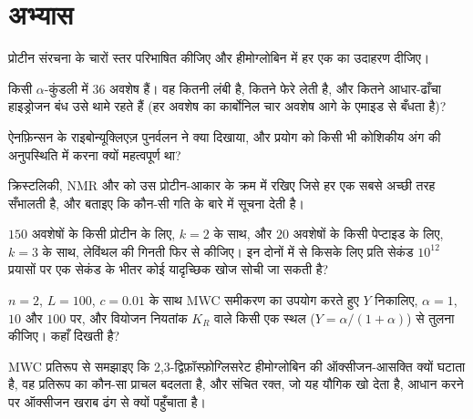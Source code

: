 \section{अभ्यास}

\begin{exercise}[$\star$]\label{exo:b3:structural-biology:1}
प्रोटीन संरचना के चारों स्तर परिभाषित कीजिए और हीमोग्लोबिन में हर एक का
उदाहरण दीजिए।
\end{exercise}

\begin{exercise}[$\star$]\label{exo:b3:structural-biology:2}
किसी $\alpha$-कुंडली में $36$ अवशेष हैं। वह कितनी लंबी है, कितने फेरे
लेती है, और कितने आधार-ढाँचा हाइड्रोजन बंध उसे थामे रहते हैं (हर अवशेष
का कार्बोनिल चार अवशेष आगे के एमाइड से बँधता है)?
\end{exercise}

\begin{exercise}[$\star$]\label{exo:b3:structural-biology:3}
ऐनफ़िन्सन के राइबोन्यूक्लिएज़ पुनर्वलन ने क्या दिखाया, और प्रयोग को
किसी भी कोशिकीय अंग की अनुपस्थिति में करना क्यों महत्वपूर्ण था?
\end{exercise}

\begin{exercise}[$\star$]\label{exo:b3:structural-biology:4}
क्रिस्टलिकी, NMR और  को उस प्रोटीन-आकार
के क्रम में रखिए जिसे हर एक सबसे अच्छी तरह सँभालती है, और बताइए कि
कौन-सी गति के बारे में सूचना देती है।
\end{exercise}

\begin{exercise}[$\star\star$]\label{exo:b3:structural-biology:5}
$150$ अवशेषों के किसी प्रोटीन के लिए, $k = 2$ के साथ, और
$20$ अवशेषों के किसी पेप्टाइड के लिए, $k = 3$ के साथ, लेविंथल की गिनती
फिर से कीजिए। इन
दोनों में से किसके लिए प्रति सेकंड $10^{12}$ प्रयासों पर एक सेकंड के
भीतर कोई यादृच्छिक खोज सोची जा सकती है?
\end{exercise}

\begin{exercise}[$\star\star$]\label{exo:b3:structural-biology:6}
$n = 2$, $L = 100$, $c = 0.01$ के साथ MWC समीकरण का उपयोग करते हुए
$Y$ निकालिए, $\alpha = 1$, $10$ और $100$ पर, और वियोजन नियतांक
$K_{R}$ वाले किसी एक स्थल ($Y = \alpha/(1+\alpha)$) से तुलना कीजिए।
 कहाँ दिखती है?
\end{exercise}

\begin{exercise}[$\star\star$]\label{exo:b3:structural-biology:7}
MWC प्रतिरूप से समझाइए कि 2,3-द्विफ़ॉस्फ़ोग्लिसरेट हीमोग्लोबिन की
ऑक्सीजन-आसक्ति क्यों घटाता है, वह प्रतिरूप का कौन-सा प्राचल बदलता है,
और संचित रक्त, जो यह यौगिक खो देता है, आधान करने पर ऑक्सीजन खराब ढंग
से क्यों पहुँचाता है।
\end{exercise}

